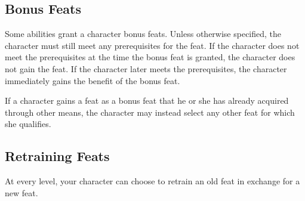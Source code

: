     \subsection{Bonus Feats}
        Some abilities grant a character bonus feats.
        Unless otherwise specified, the character must still meet any prerequisites for the feat.
        If the character does not meet the prerequisites at the time the bonus feat is granted, the character does not gain the feat.
        If the character later meets the prerequisites, the character immediately gains the benefit of the bonus feat.

        If a character gains a feat as a bonus feat that he or she has already acquired through other means, the character may instead select any other feat for which she qualifies.

    \subsection{Retraining Feats}
        At every level, your character can choose to retrain an old feat in exchange for a new feat.
